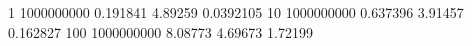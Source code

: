 1 1000000000 0.191841 4.89259 0.0392105
10 1000000000 0.637396 3.91457 0.162827
100 1000000000 8.08773 4.69673 1.72199
